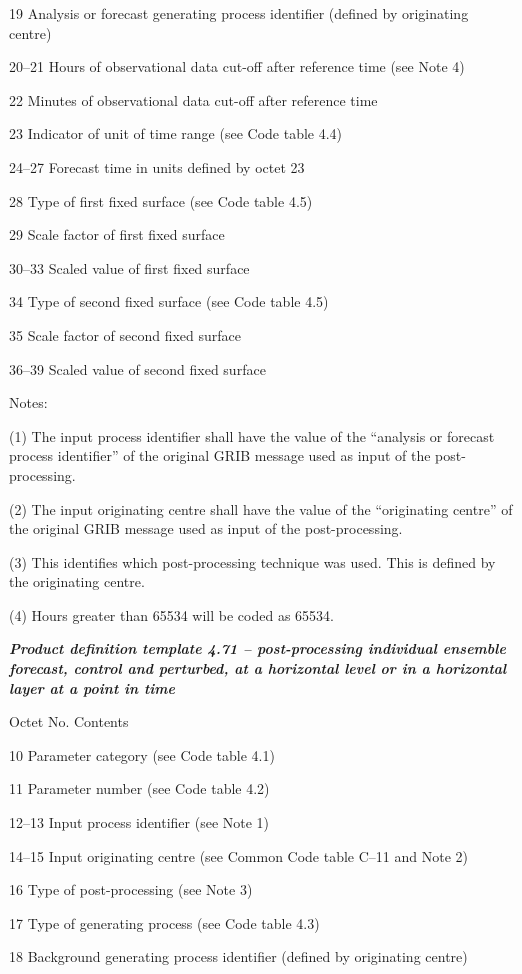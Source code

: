 19 Analysis or forecast generating process identifier (defined by originating centre)

20--21 Hours of observational data cut-off after reference time (see Note 4)

22 Minutes of observational data cut-off after reference time

23 Indicator of unit of time range (see Code table 4.4)

24--27 Forecast time in units defined by octet 23

28 Type of first fixed surface (see Code table 4.5)

29 Scale factor of first fixed surface

30--33 Scaled value of first fixed surface

34 Type of second fixed surface (see Code table 4.5)

35 Scale factor of second fixed surface

36--39 Scaled value of second fixed surface

Notes:

(1) The input process identifier shall have the value of the ``analysis or forecast process identifier'' of the original GRIB message used as input of the post-processing.

(2) The input originating centre shall have the value of the ``originating centre'' of the original GRIB message used as input of the post-processing.

(3) This identifies which post-processing technique was used. This is defined by the originating centre.

(4) Hours greater than 65534 will be coded as 65534.

\emph{\textbf{Product definition template 4.71 -- post-processing individual ensemble forecast, control and perturbed, at a horizontal level or in a horizontal layer at a point in time}}

Octet No. Contents

10 Parameter category (see Code table 4.1)

11 Parameter number (see Code table 4.2)

12--13 Input process identifier (see Note 1)

14--15 Input originating centre (see Common Code table C--11 and Note 2)

16 Type of post-processing (see Note 3)

17 Type of generating process (see Code table 4.3)

18 Background generating process identifier (defined by originating centre)

